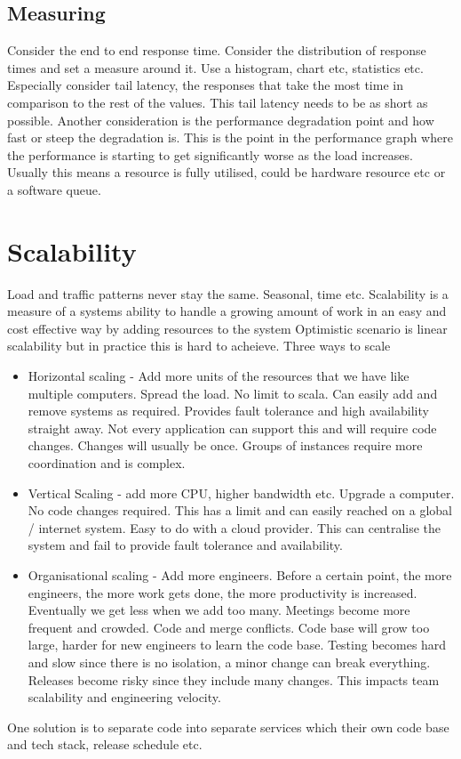\documentclass[a4paper, 11pt]{book}
\begin{document}
    \subsection{Measuring}
    Consider the end to end response time.
    Consider the distribution of response times and set a measure around it.
    Use a histogram, chart etc, statistics etc.
    Especially consider tail latency, the responses that take the most time in comparison to the rest of the values.
    This tail latency needs to be as short as possible.
    Another consideration is the performance degradation point and how fast or steep the degradation is.
    This is the point in the performance graph where the performance is starting to get significantly worse as the load increases.
    Usually this means a resource is fully utilised, could be hardware resource etc or a software queue.


    \section{Scalability}
    Load and traffic patterns never stay the same.
    Seasonal, time etc.
    Scalability is a measure of a systems ability to handle a growing amount of work in an easy and cost effective way by adding resources to the system
    Optimistic scenario is linear scalability but in practice this is hard to acheieve.
    Three ways to scale
    \begin{itemize}
        \item Horizontal scaling - Add more units of the resources that we have like multiple computers.
        Spread the load.
        No limit to scala.
        Can easily add and remove systems as required.
        Provides fault tolerance and high availability straight away.
        Not every application can support this and will require code changes.
        Changes will usually be once.
        Groups of instances require more coordination and is complex.
        \item Vertical Scaling - add more CPU, higher bandwidth etc.
        Upgrade a computer.
        No code changes required.
        This has a limit and can easily reached on a global / internet system.
        Easy to do with a cloud provider.
        This can centralise the system and fail to provide fault tolerance and availability.
        \item Organisational scaling - Add more engineers.
        Before a certain point, the more engineers, the more work gets done, the more productivity is increased.
        Eventually we get less when we add too many.
        Meetings become more frequent and crowded.
        Code and merge conflicts.
        Code base will grow too large, harder for new engineers to learn the code base.
        Testing becomes hard and slow since there is no isolation, a minor change can break everything.
        Releases become risky since they include many changes.
        This impacts team scalability and engineering velocity.
    \end{itemize}
    One solution is to separate code into separate services which their own code base and tech stack, release schedule etc.
\end{document}
